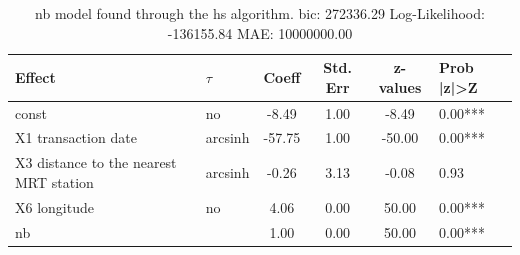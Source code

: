\begin{table}
	\caption{nb model found through the hs algorithm. bic: 272336.29 Log-Likelihood: -136155.84 MAE: 10000000.00}
	\begin{center}
		\begin{tabular}{|l|l|c|c|c|l|}
			\hline
			Effect & $\tau$ & Coeff & Std. Err & z-values & Prob |z|>Z \\
			\hline
			const & no & -8.49 & 1.00 & -8.49 & 0.00*** \\
			\hline
			X1 transaction date & arcsinh & -57.75 & 1.00 & -50.00 & 0.00*** \\
			\hline
			X3 distance to the nearest MRT station & arcsinh & -0.26 & 3.13 & -0.08 & 0.93 \\
			\hline
			X6 longitude & no & 4.06 & 0.00 & 50.00 & 0.00*** \\
			\hline
			nb &  & 1.00 & 0.00 & 50.00 & 0.00*** \\
			\hline
		\end{tabular}
	\end{center}
\end{table}